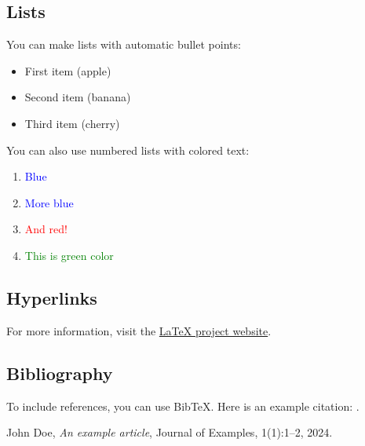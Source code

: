 \documentclass{article}
\begin{document}
	\subsection{Lists}
	You can make lists with automatic bullet points:
	\begin{itemize}
		\item First item (apple)
		\item Second item (banana)
		\item Third item (cherry)
	\end{itemize}
	
	You can also use numbered lists with colored text:
	\begin{enumerate}
		\item \textcolor{blue}{Blue}
		\item \textcolor{blue}{More blue}
		\item \textcolor{red}{And red!}
		\item \textcolor{green}{This is green color}
	\end{enumerate}
	
	\subsection{Hyperlinks}
	For more information, visit the \href{https://www.latex-project.org}{LaTeX project website}.
	
	\subsection{Bibliography}
	To include references, you can use BibTeX. Here is an example citation: \cite{Doe24}.
	
	\begin{thebibliography}{9}
		John Doe,
		\textit{An example article},
		Journal of Examples,
		1(1):1--2,
		2024.
	\end{thebibliography}
	
\end{document}
